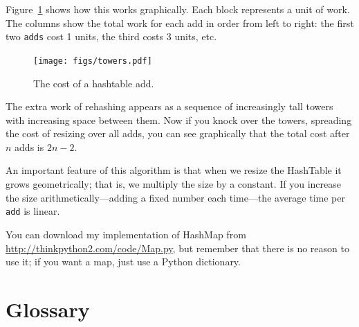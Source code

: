 \documentclass[10pt]{book}
\begin{document}
Figure~\ref{fig.hash} shows how this works graphically.  Each
block represents a unit of work.  The columns show the total
work for each add in order from left to right: the first two
{\tt adds} cost 1 units, the third costs 3 units, etc.

\begin{figure}
\centerline{\texttt{[image: figs/towers.pdf]}}
\caption{The cost of a hashtable add.\label{fig.hash}}
\end{figure}

The extra work of rehashing appears as a sequence of increasingly
tall towers with increasing space between them.  Now if you knock
over the towers, spreading the cost of resizing over all
adds, you can see graphically that the total cost after $n$
adds is $2n - 2$.

An important feature of this algorithm is that when we resize the
HashTable it grows geometrically; that is, we multiply the size by a
constant.  If you increase the size
arithmetically---adding a fixed number each time---the average time
per {\tt add} is linear.

You can download my implementation of HashMap from
\url{http://thinkpython2.com/code/Map.py}, but remember that there
is no reason to use it; if you want a map, just use a Python dictionary.

\section{Glossary}
\end{document}
